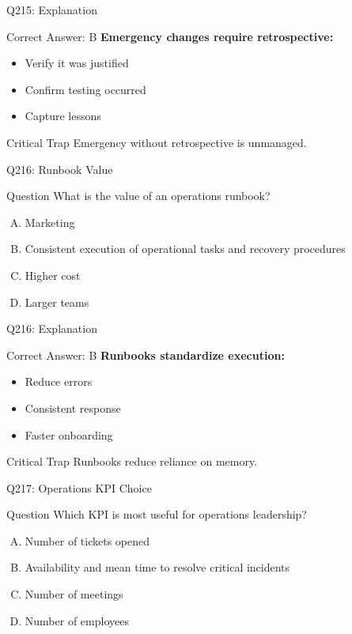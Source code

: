\documentclass{beamer}
\begin{document}
	\begin{frame}{Q215: Explanation}
		\begin{block}{Correct Answer: B}
			\textbf{Emergency changes require retrospective:}
			\begin{itemize}
				\item Verify it was justified
				\item Confirm testing occurred
				\item Capture lessons
			\end{itemize}
		\end{block}
		\begin{alertblock}{Critical Trap}
			Emergency without retrospective is unmanaged.
		\end{alertblock}
	\end{frame}
	
	\begin{frame}{Q216: Runbook Value}
		\begin{block}{Question}
			What is the value of an operations runbook?
		\end{block}
		\begin{enumerate}[(A)]
			\item Marketing
			\item Consistent execution of operational tasks and recovery procedures
			\item Higher cost
			\item Larger teams
		\end{enumerate}
	\end{frame}
	
	\begin{frame}{Q216: Explanation}
		\begin{block}{Correct Answer: B}
			\textbf{Runbooks standardize execution:}
			\begin{itemize}
				\item Reduce errors
				\item Consistent response
				\item Faster onboarding
			\end{itemize}
		\end{block}
		\begin{alertblock}{Critical Trap}
			Runbooks reduce reliance on memory.
		\end{alertblock}
	\end{frame}
	
	\begin{frame}{Q217: Operations KPI Choice}
		\begin{block}{Question}
			Which KPI is most useful for operations leadership?
		\end{block}
		\begin{enumerate}[(A)]
			\item Number of tickets opened
			\item Availability and mean time to resolve critical incidents
			\item Number of meetings
			\item Number of employees
		\end{enumerate}
	\end{frame}
	
\end{document}
